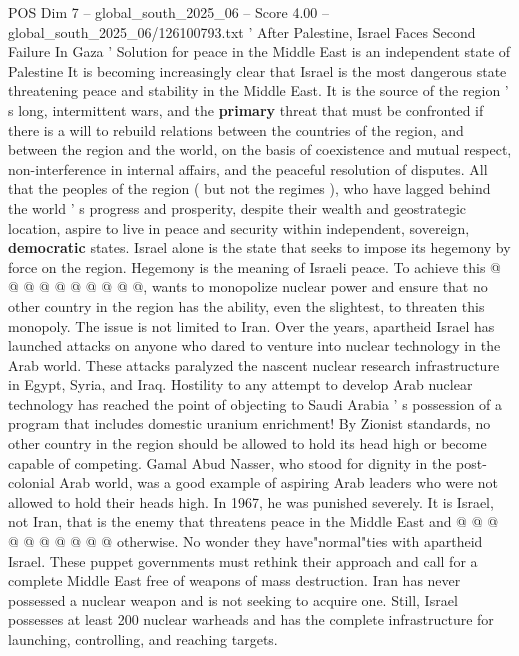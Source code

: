 \begin{textsample}{POS Dim 7 – global\_south\_2025\_06 – Score 4.00 – global\_south\_2025\_06/126100793.txt}  \label{ex:f7_pos_400}
' After Palestine, Israel Faces Second Failure In Gaza ' Solution for peace in the Middle East is an independent state of Palestine It is becoming increasingly clear that Israel is the most dangerous state threatening peace and stability in the Middle East.
It is the source of the region ' s long, intermittent wars, and the \textbf{primary} threat that must be confronted if there is a will to rebuild relations between the countries of the region, and between the region and the world, on the basis of coexistence and mutual respect, non-interference in internal affairs, and the peaceful resolution of disputes.
All that the peoples of the region ( but not the regimes ), who have lagged behind the world ' s progress and prosperity, despite their wealth and geostrategic location, aspire to live in peace and security within independent, sovereign, \textbf{democratic} states.
Israel alone is the state that seeks to impose its hegemony by force on the region.
Hegemony is the meaning of Israeli peace.
To achieve this @ @ @ @ @ @ @ @ @ @, wants to monopolize nuclear power and ensure that no other country in the region has the ability, even the slightest, to threaten this monopoly.
The issue is not limited to Iran.
Over the years, apartheid Israel has launched attacks on anyone who dared to venture into nuclear technology in the Arab world.
These attacks paralyzed the nascent nuclear research infrastructure in Egypt, Syria, and Iraq.
Hostility to any attempt to develop Arab nuclear technology has reached the point of objecting to Saudi Arabia ' s possession of a program that includes domestic uranium enrichment!
By Zionist standards, no other country in the region should be allowed to hold its head high or become capable of competing.
Gamal Abud Nasser, who stood for dignity in the post-colonial Arab world, was a good example of aspiring Arab leaders who were not allowed to hold their heads high.
In 1967, he was punished severely.
It is Israel, not Iran, that is the enemy that threatens peace in the Middle East and @ @ @ @ @ @ @ @ @ @ otherwise.
No wonder they have"normal"ties with apartheid Israel.
These puppet governments must rethink their approach and call for a complete Middle East free of weapons of mass destruction.
Iran has never possessed a nuclear weapon and is not seeking to acquire one.
Still, Israel possesses at least 200 nuclear warheads and has the complete infrastructure for launching, controlling, and reaching targets.

\end{textsample}

